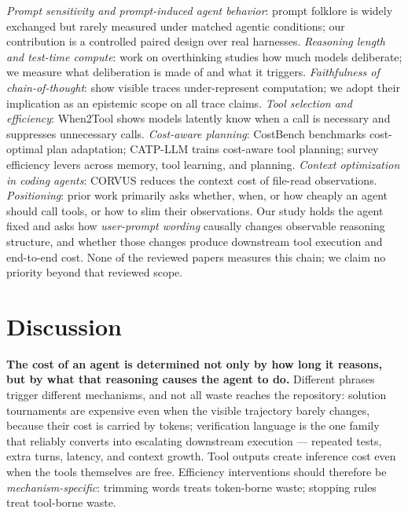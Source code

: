 \documentclass[11pt]{article}
\newcommand{\citet}[1]{\cite{#1}}
\newcommand{\citep}[1]{\cite{#1}}
\begin{document}
\emph{Prompt sensitivity and prompt-induced agent behavior}: prompt
folklore is widely exchanged but rarely measured under matched agentic
conditions; our contribution is a controlled paired design over real
harnesses. \emph{Reasoning length and test-time compute}: work on
overthinking studies how much models deliberate; we measure what
deliberation is made of and what it triggers. \emph{Faithfulness of
chain-of-thought}: \citet{baherwani2026} show visible traces
under-represent computation; we adopt their implication as an epistemic
scope on all trace claims. \emph{Tool selection and efficiency}:
When2Tool \citep{sun2026when2tool} shows models latently know when a call
is necessary and suppresses unnecessary calls. \emph{Cost-aware
planning}: CostBench \citep{liu2025costbench} benchmarks cost-optimal
plan adaptation; CATP-LLM \citep{wu2024catp} trains cost-aware tool
planning; \citet{yang2026efficient} survey efficiency levers across
memory, tool learning, and planning. \emph{Context optimization in coding
agents}: CORVUS \citep{zheng2026corvus} reduces the context cost of
file-read observations. \emph{Positioning}: prior work primarily asks
whether, when, or how cheaply an agent should call tools, or how to slim
their observations. Our study holds the agent fixed and asks how
\emph{user-prompt wording} causally changes observable reasoning
structure, and whether those changes produce downstream tool execution
and end-to-end cost. None of the reviewed papers measures this chain;
we claim no priority beyond that reviewed scope.

\section{Discussion}

\textbf{The cost of an agent is determined not only by how long it
reasons, but by what that reasoning causes the agent to do.} Different
phrases trigger different mechanisms, and not all waste reaches the
repository: solution tournaments are expensive even when the visible
trajectory barely changes, because their cost is carried by tokens;
verification language is the one family that reliably converts into
escalating downstream execution --- repeated tests, extra turns, latency,
and context growth. Tool outputs create inference cost even when the
tools themselves are free. Efficiency interventions should therefore be
\emph{mechanism-specific}: trimming words treats token-borne waste;
stopping rules treat tool-borne waste.
\end{document}
